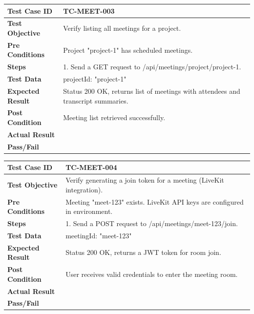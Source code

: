 \begin{longtable}{|p{}|p{}|}
\hline
\textbf{Test Case ID} & TC-MEET-003 \\ \hline
\textbf{Test Objective} & Verify listing all meetings for a project. \\ \hline
\textbf{Pre Conditions} & Project "project-1" has scheduled meetings. \\ \hline
\textbf{Steps} & 
1. Send a GET request to /api/meetings/project/project-1. \\ \hline
\textbf{Test Data} & projectId: "project-1" \\ \hline
\textbf{Expected Result} & Status 200 OK, returns list of meetings with attendees and transcript summaries. \\ \hline
\textbf{Post Condition} & Meeting list retrieved successfully. \\ \hline
\textbf{Actual Result} &  \\ \hline
\textbf{Pass/Fail} &  \\ \hline
\end{longtable}

\begin{longtable}{|p{}|p{}|}
\hline
\textbf{Test Case ID} & TC-MEET-004 \\ \hline
\textbf{Test Objective} & Verify generating a join token for a meeting (LiveKit integration). \\ \hline
\textbf{Pre Conditions} & Meeting "meet-123" exists. LiveKit API keys are configured in environment. \\ \hline
\textbf{Steps} & 
1. Send a POST request to /api/meetings/meet-123/join. \\ \hline
\textbf{Test Data} & meetingId: "meet-123" \\ \hline
\textbf{Expected Result} & Status 200 OK, returns a JWT token for room join. \\ \hline
\textbf{Post Condition} & User receives valid credentials to enter the meeting room. \\ \hline
\textbf{Actual Result} &  \\ \hline
\textbf{Pass/Fail} &  \\ \hline
\end{longtable}

